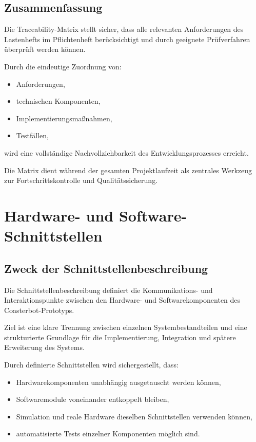 \documentclass[
  a4paper,
  12pt,
  DIV=12,        %
  parskip=half,  %
  headings=small %
]{scrartcl}
\theoremstyle{definition}
\providecommand{\tightlist}{%
  \setlength{\itemsep}{0pt}\setlength{\parskip}{0pt}}
\theoremstyle{definition}
\begin{document}
\subsection{Zusammenfassung}\label{zusammenfassung-7}

Die Traceability-Matrix stellt sicher, dass alle relevanten
Anforderungen des Lastenhefts im Pflichtenheft berücksichtigt und durch
geeignete Prüfverfahren überprüft werden können.

Durch die eindeutige Zuordnung von:

\begin{itemize}
\tightlist
\item
  Anforderungen,
\item
  technischen Komponenten,
\item
  Implementierungsmaßnahmen,
\item
  Testfällen,
\end{itemize}

wird eine vollständige Nachvollziehbarkeit des Entwicklungsprozesses
erreicht.

Die Matrix dient während der gesamten Projektlaufzeit als zentrales
Werkzeug zur Fortschrittskontrolle und Qualitätssicherung.

\section{Hardware- und
Software-Schnittstellen}\label{hardware--und-software-schnittstellen}

\subsection{Zweck der
Schnittstellenbeschreibung}\label{zweck-der-schnittstellenbeschreibung}

Die Schnittstellenbeschreibung definiert die Kommunikations- und
Interaktionspunkte zwischen den Hardware- und Softwarekomponenten des
Coasterbot-Prototyps.

Ziel ist eine klare Trennung zwischen einzelnen Systembestandteilen und
eine strukturierte Grundlage für die Implementierung, Integration und
spätere Erweiterung des Systems.

Durch definierte Schnittstellen wird sichergestellt, dass:

\begin{itemize}
\tightlist
\item
  Hardwarekomponenten unabhängig ausgetauscht werden können,
\item
  Softwaremodule voneinander entkoppelt bleiben,
\item
  Simulation und reale Hardware dieselben Schnittstellen verwenden
  können,
\item
  automatisierte Tests einzelner Komponenten möglich sind.
\end{itemize}
\end{document}
